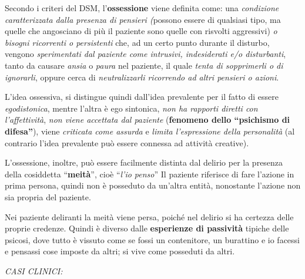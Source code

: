 Secondo i criteri del DSM, l'\textbf{ossessione} viene definita come:
una \emph{condizione caratterizzata dalla presenza di pensieri (}possono
essere di qualsiasi tipo, ma quelle che angosciano di più il paziente
sono quelle con risvolti aggressivi) \emph{o bisogni ricorrenti o
persistenti} che, ad un certo punto durante il disturbo, vengono
\emph{sperimentati dal paziente come intrusivi, indesiderati e/o
disturbanti}, tanto da causare \emph{ansia} o \emph{paura} nel paziente,
il quale \emph{tenta di sopprimerli o di ignorarli}, oppure cerca di
\emph{neutralizzarli ricorrendo ad altri pensieri o azioni}.

L'idea ossessiva, si distingue quindi dall'idea prevalente per il fatto
di essere \emph{egodistonica}, mentre l'altra è ego sintonica, \emph{non
ha rapporti diretti con l'affettività}, \emph{non viene accettata dal
paziente} (\textbf{fenomeno dello ``psichismo di difesa''}), viene
\emph{criticata come assurda} e \emph{limita l'espressione della
personalità} (al contrario l'idea prevalente può essere connessa ad
attività creative).

L'ossessione, inoltre, può essere facilmente distinta dal delirio per la
presenza della cosiddetta ``\textbf{meità}'', cioè ``\emph{l'io penso}''
Il paziente riferisce di fare l'azione in prima persona, quindi non è
posseduto da un'altra entità, nonostante l'azione non sia propria del
paziente.

Nei paziente deliranti la meità viene persa, poiché nel delirio si ha
certezza delle proprie credenze. Quindi è diverso dalle
\textbf{esperienze di passività} tipiche delle psicosi, dove tutto è
vissuto come se fossi un contenitore, un burattino e io facessi e
pensassi cose imposte da altri; si vive come posseduti da altri.

\emph{\emph{CASI CLINICI:}}

